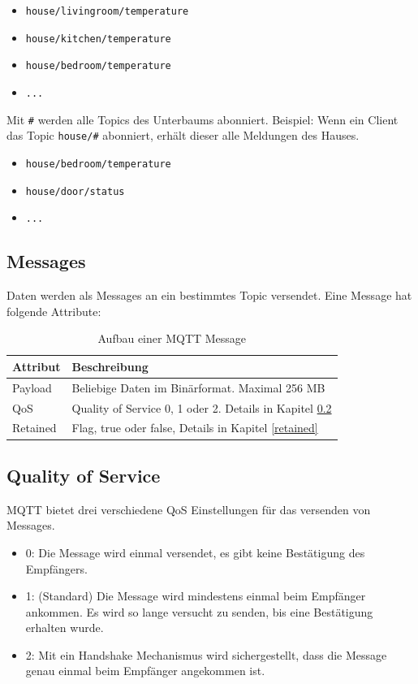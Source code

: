 \begin{itemize}
	\item \texttt{house/livingroom/temperature}
    \item \texttt{house/kitchen/temperature}
    \item \texttt{house/bedroom/temperature}
    \item \texttt{...}
\end{itemize}

Mit \texttt{\#} werden alle Topics des Unterbaums abonniert.
Beispiel: Wenn ein Client das Topic \texttt{house/\#} abonniert, erhält dieser alle Meldungen des Hauses.

\begin{itemize}
	\item \texttt{house/bedroom/temperature}
    \item \texttt{house/door/status}
    \item \texttt{...}
\end{itemize}

\subsection{Messages}
Daten werden als Messages an ein bestimmtes Topic versendet. Eine Message hat folgende Attribute:

\begin{table}[H]
\centering
\begin{tabular}{|l|l|}
	\hline \rowcolor{lightgray}
	\textbf{Attribut} & \textbf{Beschreibung} \\ \hline
	Payload   & Beliebige Daten im Binärformat. Maximal 256 MB     \\ \hline
	QoS       & Quality of Service 0, 1 oder 2. Details in Kapitel \ref{qos}    \\ \hline
	Retained  & Flag, true oder false, Details in Kapitel \ref{retained}     \\  	\hline
\end{tabular}
\caption{Aufbau einer MQTT Message}
\end{table}


\subsection{Quality of Service} \label{qos}
MQTT bietet drei verschiedene QoS Einstellungen für das versenden von Messages.
\begin{itemize}
\item 0: Die Message wird einmal versendet, es gibt keine Bestätigung des Empfängers.
\item 1: (Standard) Die Message wird mindestens einmal beim Empfänger ankommen. Es wird so lange versucht zu senden, bis eine Bestätigung erhalten wurde.
\item 2: Mit ein Handshake Mechanismus wird sichergestellt, dass die Message genau einmal beim Empfänger angekommen ist.
\end{itemize}

